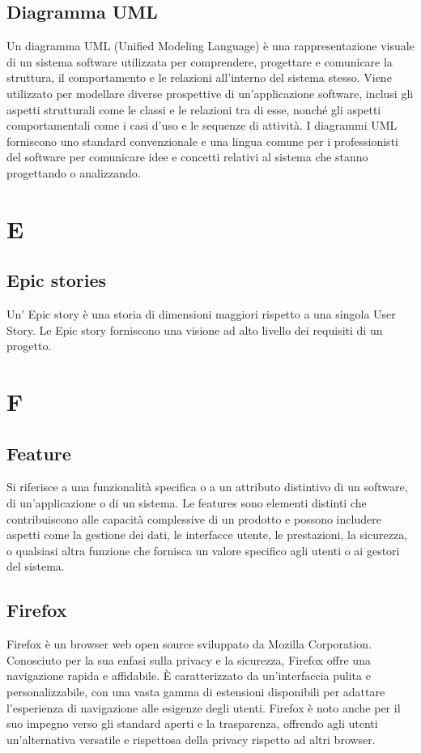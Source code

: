\documentclass{article}
\begin{document}
\subsection{Diagramma UML}
Un diagramma UML (Unified Modeling Language) è una rappresentazione visuale di un sistema software utilizzata per comprendere, progettare e comunicare la struttura, il comportamento e le relazioni all'interno del sistema stesso. Viene utilizzato per modellare diverse prospettive di un'applicazione software, inclusi gli aspetti strutturali come le classi e le relazioni tra di esse, nonché gli aspetti comportamentali come i casi d'uso e le sequenze di attività. I diagrammi UML forniscono uno standard convenzionale e una lingua comune per i professionisti del software per comunicare idee e concetti relativi al sistema che stanno progettando o analizzando.

\section{E}
\subsection{Epic stories}
Un' Epic story è una storia di dimensioni maggiori rispetto a una singola User Story.
Le Epic story forniscono una visione ad alto livello dei requisiti di un progetto.

\section{F}
\subsection{Feature}
Si riferisce a una funzionalità specifica o a un attributo distintivo di un software, di un'applicazione o di un sistema. Le features sono elementi distinti che contribuiscono alle capacità complessive di un prodotto e possono includere aspetti come la gestione dei dati, le interfacce utente, le prestazioni, la sicurezza, o qualsiasi altra funzione che fornisca un valore specifico agli utenti o ai gestori del sistema. 

\subsection{Firefox}
Firefox è un browser web open source sviluppato da Mozilla Corporation. Conosciuto per la sua enfasi sulla privacy e la sicurezza, Firefox offre una navigazione rapida e affidabile. È caratterizzato da un'interfaccia pulita e personalizzabile, con una vasta gamma di estensioni disponibili per adattare l'esperienza di navigazione alle esigenze degli utenti. Firefox è noto anche per il suo impegno verso gli standard aperti e la trasparenza, offrendo agli utenti un'alternativa versatile e rispettosa della privacy rispetto ad altri browser.
\end{document}
